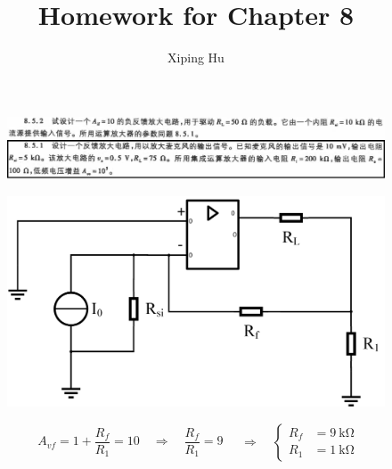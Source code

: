\documentclass{article}
\author{Xiping Hu}
\affil{https://hxp.plus/}
\title{Homework for Chapter 8}
\newcommand{\si}[1]{\  \mathrm{#1}}
\begin{document}
\maketitle

\begin{figure}[H]
  \centering
  \includegraphics[width=\linewidth]{figures/Problem852}
\end{figure}

\begin{figure}[H]
  \centering
  \includegraphics[width=0.7\linewidth]{figures/Problem8521}
\end{figure}

\begin{equation*}
  \begin{aligned}
    A_{vf} = 1 + \dfrac{R_f}{R_1} = 10 \quad \Rightarrow \quad \dfrac{R_f}{R_1} = 9 \quad
  \end{aligned}
  \Rightarrow
  \quad
  \left\{
    \begin{aligned}
      R_f &= 9 \si{k\Omega} \\
      R_1 &= 1 \si{k\Omega} 
    \end{aligned}
  \right.
\end{equation*}
\end{document}
